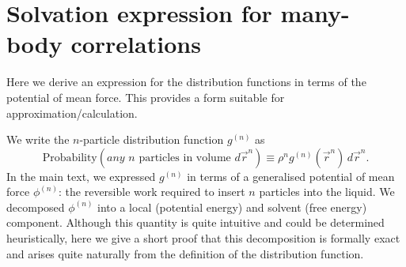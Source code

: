 \documentclass[12pt]{report}
\begin{document}

\section{Solvation expression for many-body correlations}

Here we derive an expression for the distribution functions in terms of the potential of mean force.
This provides a form suitable for approximation/calculation.

We write the $n$-particle distribution function $g^{(n)}$ as
\begin{equation}\label{eq:n-density-pdf}
  \textrm{Probability}\left( \textit{any } n \textrm{ particles in volume } d\vec{r}^n \right)
  \equiv
  \rho^n g^{(n)}(\vec{r}^n) \, d\vec{r}^n.
\end{equation}
In the main text, we expressed $g^{(n)}$ in terms of a generalised potential of mean force $\phi^{(n)}$: the reversible work required to insert $n$ particles into the liquid.
We decomposed $\phi^{(n)}$ into a local (potential energy) and solvent (free energy) component.
Although this quantity is quite intuitive and could be determined heuristically, here we give a short proof that this decomposition is formally exact and arises quite naturally from the definition of the distribution function.
\end{document}
